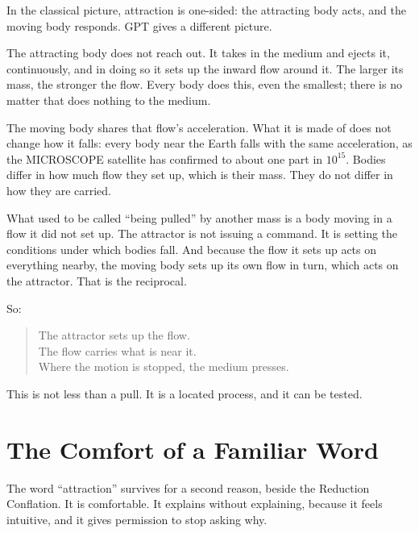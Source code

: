 \documentclass[11pt,a4paper]{article}
\begin{document}
In the classical picture, attraction is one-sided: the attracting body acts, and the moving body responds. GPT gives a different picture.

\begin{hypbar}
The attracting body does not reach out. It takes in the medium and ejects it, continuously, and in doing so it sets up the inward flow around it. The larger its mass, the stronger the flow. Every body does this, even the smallest; there is no matter that does nothing to the medium.

The moving body shares that flow's acceleration. What it is made of does not change how it falls: every body near the Earth falls with the same acceleration, as the MICROSCOPE satellite has confirmed to about one part in $10^{15}$.\footnotemark{} Bodies differ in how much flow they set up, which is their mass. They do not differ in how they are carried.

What used to be called ``being pulled'' by another mass is a body moving in a flow it did not set up. The attractor is not issuing a command. It is setting the conditions under which bodies fall. And because the flow it sets up acts on everything nearby, the moving body sets up its own flow in turn, which acts on the attractor. That is the reciprocal.
\end{hypbar}


So:
\begin{quote}
The attractor sets up the flow.\\
The flow carries what is near it.\\
Where the motion is stopped, the medium presses.
\end{quote}

This is not less than a pull. It is a located process, and it can be tested.

\section{The Comfort of a Familiar Word}

The word ``attraction'' survives for a second reason, beside the Reduction Conflation. It is comfortable. It explains without explaining, because it feels intuitive, and it gives permission to stop asking why.
\end{document}
